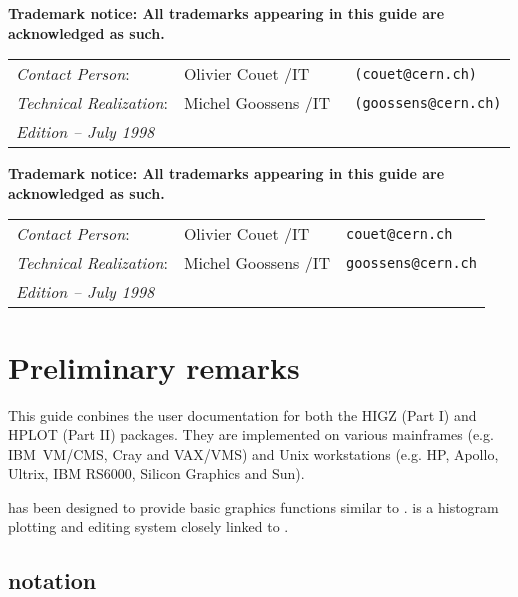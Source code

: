 {\bf Trademark notice: All trademarks appearing in this guide are acknowledged as such.}
\vfill
\begin{tabular}{l@{\quad}l@{\quad}>{\tt}l}
{\em Contact Person\/}:        & Olivier Couet /IT   & (couet@cern.ch)\\[1mm]
{\em Technical Realization\/}: & Michel Goossens /IT & (goossens@cern.ch)\\[1cm]
{\em Edition -- July 1998}
\end{tabular}
\begin{htmlonly}
{\bf Trademark notice: All trademarks appearing in this guide are acknowledged as such.}

\begin{tabular}{lll}
\emph{Contact Person}:        & Olivier Couet /IT      & \texttt{couet@cern.ch}\\
\emph{Technical Realization}: & Michel Goossens /IT & \texttt{goossens@cern.ch}\\
\emph{Edition -- July 1998}
\end{tabular}
\end{htmlonly}
\newpage

\setcounter{page}{1}

\section*{Preliminary remarks}

This guide conbines the user documentation for both the
HIGZ (Part I) and HPLOT (Part II) packages.
They are implemented on various mainframes (e.g. IBM~VM/CMS, Cray and VAX/VMS)
and Unix workstations (e.g. HP, Apollo, Ultrix, IBM RS6000, Silicon Graphics and 
Sun).
 
\HIGZ{} has been designed to provide basic graphics functions similar to \GKS. 
\HPLOT{} is a histogram plotting and editing system closely linked to 
\HBOOK.

\subsection*{notation}

